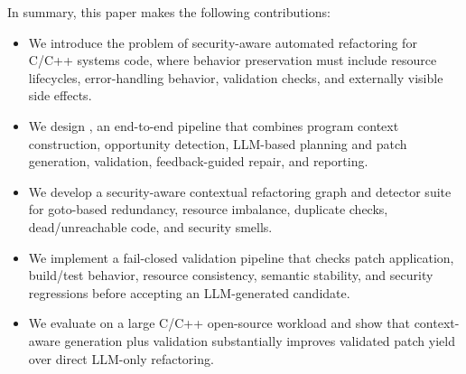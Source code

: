 In summary, this paper makes the following contributions:
\begin{itemize}
    \item We introduce the problem of security-aware automated refactoring for
    C/C++ systems code, where behavior preservation must include resource
    lifecycles, error-handling behavior, validation checks, and externally
    visible side effects.
    \item We design \SysName{}, an end-to-end pipeline that combines program
    context construction, opportunity detection, LLM-based planning and patch
    generation, validation, feedback-guided repair, and reporting.
    \item We develop a security-aware contextual refactoring graph and detector
    suite for goto-based redundancy, resource imbalance, duplicate checks,
    dead/unreachable code, and security smells.
    \item We implement a fail-closed validation pipeline that checks patch
    application, build/test behavior, resource consistency, semantic stability,
    and security regressions before accepting an LLM-generated candidate.
    \item We evaluate \SysName{} on a large C/C++ open-source workload and show
    that context-aware generation plus validation substantially improves
    validated patch yield over direct LLM-only refactoring.
\end{itemize}

